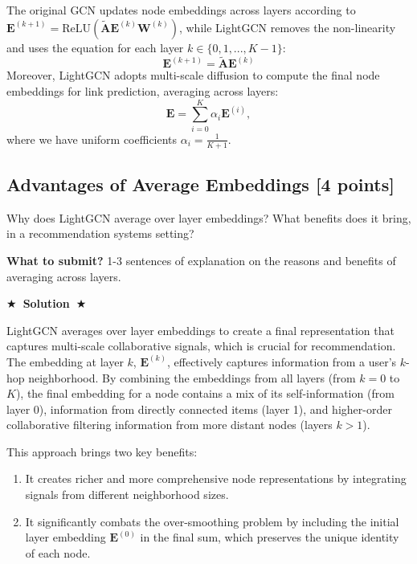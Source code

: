 \documentclass{article}
\numberwithin{figure}{section}
\newcommand{\Solution}[1]{%
    {%
        \medskip
        \color{red}
        \bf $\bigstar$~\sf\textbf{Solution}~$\bigstar$ \sf
        #1
    }
    \bigskip
}
\begin{document}
\noindent The original GCN updates node embeddings across layers according to $\mathbf{E}^{(k+1)} = \text{ReLU}(\tilde{\mathbf{A}} \mathbf{E}^{(k)} \mathbf{W}^{(k)})$, while LightGCN removes the non-linearity and uses the equation for each layer $k\in \{0, 1, ..., K-1\}$:
\begin{equation}
    \mathbf{E}^{(k+1)} = \tilde{\mathbf{A}} \mathbf{E}^{(k)}
\end{equation}
Moreover, LightGCN adopts multi-scale diffusion to compute the final node embeddings for link prediction, averaging across layers:
\begin{equation}\label{eq:lightgcn-diff}
    \mathbf{E} = \sum_{i=0}^{K} \alpha_{i} \mathbf{E}^{(i)},
\end{equation}
where we have uniform coefficients $\alpha_{i} = \frac{1}{K + 1}$.


\subsection{Advantages of Average Embeddings [4 points]}
Why does LightGCN average over layer embeddings? What benefits does it bring, in a recommendation systems setting?

\textbf{What to submit?} 1-3 sentences of explanation on the reasons and benefits of averaging across layers.

\Solution{
	LightGCN averages over layer embeddings to create a final representation that captures multi-scale collaborative signals, which is crucial for recommendation. The embedding at layer $k$, $\mathbf{E}^{(k)}$, effectively captures information from a user's $k$-hop neighborhood. By combining the embeddings from all layers (from $k=0$ to $K$), the final embedding for a node contains a mix of its self-information (from layer 0), information from directly connected items (layer 1), and higher-order collaborative filtering information from more distant nodes (layers $k>1$).
	
	This approach brings two key benefits:
	\begin{enumerate}
		\item It creates richer and more comprehensive node representations by integrating signals from different neighborhood sizes.
		\item It significantly combats the over-smoothing problem by including the initial layer embedding $\mathbf{E}^{(0)}$ in the final sum, which preserves the unique identity of each node.
	\end{enumerate}
}
\end{document}
